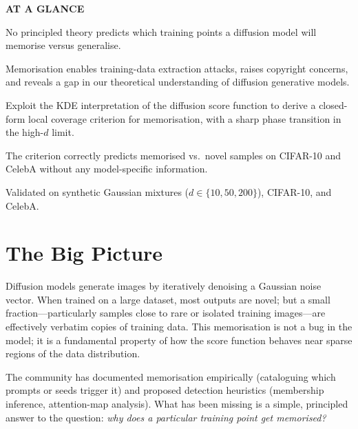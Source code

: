 \documentclass[10pt,twocolumn]{article}
\begin{document}
\begin{mdframed}[backgroundcolor=boxgray,linecolor=rulered,linewidth=1pt,
    innerleftmargin=6pt,innerrightmargin=6pt,
    innertopmargin=6pt,innerbottommargin=6pt]
\textbf{\small AT A GLANCE}\par\vspace{4pt}
\begin{description}[leftmargin=0pt,labelsep=4pt,itemsep=2pt,parsep=0pt,
    font=\small\bfseries]
  \item[Problem:] No principled theory predicts which training points a
    diffusion model will memorise versus generalise.
  \item[Why it matters:] Memorisation enables training-data extraction
    attacks, raises copyright concerns, and reveals a gap in our theoretical
    understanding of diffusion generative models.
  \item[Method:] Exploit the KDE interpretation of the diffusion score
    function to derive a closed-form local coverage criterion for
    memorisation, with a sharp phase transition in the high-$d$ limit.
  \item[Result:] The criterion correctly predicts memorised vs.\ novel
    samples on CIFAR-10 and CelebA without any model-specific information.
  \item[Evidence:] Validated on synthetic Gaussian mixtures ($d\in\{10,50,200\}$),
    CIFAR-10, and CelebA.
\end{description}
\end{mdframed}

\section{The Big Picture}

Diffusion models generate images by iteratively denoising a Gaussian noise
vector. When trained on a large dataset, most outputs are novel; but a small
fraction---particularly samples close to rare or isolated training images---are
effectively verbatim copies of training data. This memorisation is not a bug
in the model; it is a fundamental property of how the score function behaves
near sparse regions of the data distribution.

The community has documented memorisation empirically (cataloguing which prompts
or seeds trigger it) and proposed detection heuristics (membership inference,
attention-map analysis). What has been missing is a simple, principled answer
to the question: \emph{why does a particular training point get memorised?}
\end{document}
